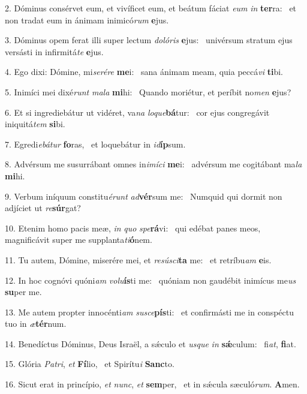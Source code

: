 2. Dóminus consérvet eum, et vivíficet eum, et beátum fáciat \textit{e}\textit{um} \textit{in} \textbf{ter}ra: \ast\  et non tradat eum in ánimam inimicó\textit{rum} \textbf{e}jus.\

3. Dóminus opem ferat illi super lectum \textit{do}\textit{ló}\textit{ris} \textbf{e}jus: \ast\  univérsum stratum ejus versásti in infirmitá\textit{te} \textbf{e}jus.\

4. Ego dixi: Dómine, mi\textit{se}\textit{ré}\textit{re} \textbf{me}i: \ast\  sana ánimam meam, quia peccá\textit{vi} \textbf{ti}bi.\

5. Inimíci mei dixé\textit{runt} \textit{ma}\textit{la} \textbf{mi}hi: \ast\  Quando moriétur, et períbit no\textit{men} \textbf{e}jus?\

6. Et si ingrediebátur ut vidéret, va\textit{na} \textit{lo}\textit{que}\textbf{bá}tur: \ast\  cor ejus congregávit iniquitá\textit{tem} \textbf{si}bi.\

7. Egredi\textit{e}\textit{bá}\textit{tur} \textbf{fo}ras, \ast\  et loquebátur in \textit{id}\textbf{íp}sum.\

8. Advérsum me susurrábant omnes in\textit{i}\textit{mí}\textit{ci} \textbf{me}i: \ast\  advérsum me cogitábant ma\textit{la} \textbf{mi}hi.\

9. Verbum iníquum constitu\textit{é}\textit{runt} \textit{ad}\textbf{vér}sum me: \ast\  Numquid qui dormit non adjíciet ut \textit{re}\textbf{súr}gat?\

10. Etenim homo pacis meæ, \textit{in} \textit{quo} \textit{spe}\textbf{rá}vi: \ast\  qui edébat panes meos, magnificávit super me supplanta\textit{ti}\textbf{ó}nem.\

11. Tu autem, Dómine, miserére mei, et \textit{re}\textit{sú}\textit{sci}\textbf{ta} me: \ast\  et retríbu\textit{am} \textbf{e}is.\

12. In hoc cognóvi quóni\textit{am} \textit{vo}\textit{lu}\textbf{ís}ti me: \ast\  quóniam non gaudébit inimícus me\textit{us} \textbf{su}per me.\

13. Me autem propter innocénti\textit{am} \textit{su}\textit{sce}\textbf{pís}ti: \ast\  et confirmásti me in conspéctu tuo in \textit{æ}\textbf{tér}num.\

14. Benedíctus Dóminus, Deus Israël, a sǽculo et \textit{us}\textit{que} \textit{in} \textbf{sǽ}culum: \ast\  fi\textit{at}, \textbf{fi}at.\

15. Glória \textit{Pa}\textit{tri}, \textit{et} \textbf{Fí}lio, \ast\  et Spirítu\textit{i} \textbf{Sanc}to.\

16. Sicut erat in princípio, \textit{et} \textit{nunc}, \textit{et} \textbf{sem}per, \ast\  et in sǽcula sæculó\textit{rum}. \textbf{A}men.\

